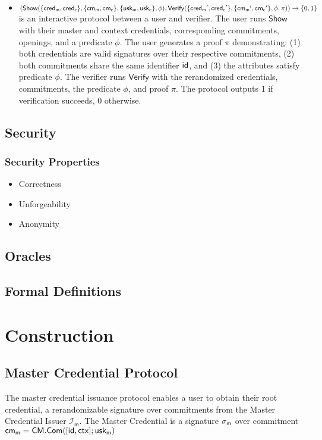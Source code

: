 \begin{definition}
\begin{itemize}
    \item $(\mathsf{Show}(\{\mathsf{cred_m}, \mathsf{cred_c}\}, \{\mathsf{cm_m}, \mathsf{cm_c}\}, \{\mathsf{usk_m}, \mathsf{usk_c}\}, \phi), \mathsf{Verify}(\{\mathsf{cred_m}', \mathsf{cred_c}'\}, \{\mathsf{cm_m}', \mathsf{cm_c}'\}, \phi, \pi)) \rightarrow \{0,1\}$ is an interactive protocol between a user and verifier. The user runs $\mathsf{Show}$ with their master and context credentials, corresponding commitments, openings, and a predicate $\phi$. The user generates a proof $\pi$ demonstrating: (1) both credentials are valid signatures over their respective commitments, (2) both commitments share the same identifier $\mathsf{id}$, and (3) the attributes satisfy predicate $\phi$. The verifier runs $\mathsf{Verify}$ with the rerandomized credentials, commitments, the predicate $\phi$, and proof $\pi$. The protocol outputs 1 if verification succeeds, 0 otherwise.
    \end{itemize}
\end{definition}

\newpage
\subsection{Security}
\subsubsection{Security Properties}

\begin{itemize}
    \item Correctness
    \item Unforgeability
    \item Anonymity
\end{itemize}






\subsection{Oracles}

\subsection{Formal Definitions}


\section{Construction}



\subsection{Master Credential Protocol}
The master credential issuance protocol enables a user to obtain their root credential, a rerandomizable signature over commitments from the Master Credential Issuer $\mathcal{I}_{\mathsf{m}}.$ The Master Credential is a signature $\sigma_{\mathsf{m}}$ over commitment $\mathsf{cm_m} = \mathsf{CM.Com}([\mathsf{id}, \mathsf{ctx}]; \mathsf{usk_m})$


